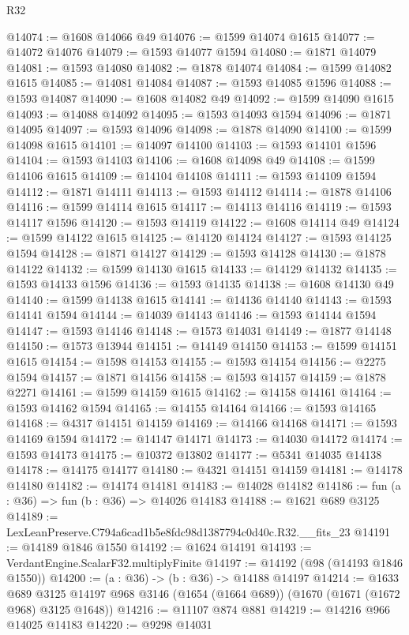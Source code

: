 \begin{lexlean}{R32}
\begin{coremodule}
@14074 := @1608 @14066 @49
@14076 := @1599 @14074 @1615
@14077 := @14072 @14076
@14079 := @1593 @14077 @1594
@14080 := @1871 @14079
@14081 := @1593 @14080
@14082 := @1878 @14074
@14084 := @1599 @14082 @1615
@14085 := @14081 @14084
@14087 := @1593 @14085 @1596
@14088 := @1593 @14087
@14090 := @1608 @14082 @49
@14092 := @1599 @14090 @1615
@14093 := @14088 @14092
@14095 := @1593 @14093 @1594
@14096 := @1871 @14095
@14097 := @1593 @14096
@14098 := @1878 @14090
@14100 := @1599 @14098 @1615
@14101 := @14097 @14100
@14103 := @1593 @14101 @1596
@14104 := @1593 @14103
@14106 := @1608 @14098 @49
@14108 := @1599 @14106 @1615
@14109 := @14104 @14108
@14111 := @1593 @14109 @1594
@14112 := @1871 @14111
@14113 := @1593 @14112
@14114 := @1878 @14106
@14116 := @1599 @14114 @1615
@14117 := @14113 @14116
@14119 := @1593 @14117 @1596
@14120 := @1593 @14119
@14122 := @1608 @14114 @49
@14124 := @1599 @14122 @1615
@14125 := @14120 @14124
@14127 := @1593 @14125 @1594
@14128 := @1871 @14127
@14129 := @1593 @14128
@14130 := @1878 @14122
@14132 := @1599 @14130 @1615
@14133 := @14129 @14132
@14135 := @1593 @14133 @1596
@14136 := @1593 @14135
@14138 := @1608 @14130 @49
@14140 := @1599 @14138 @1615
@14141 := @14136 @14140
@14143 := @1593 @14141 @1594
@14144 := @14039 @14143
@14146 := @1593 @14144 @1594
@14147 := @1593 @14146
@14148 := @1573 @14031
@14149 := @1877 @14148
@14150 := @1573 @13944
@14151 := @14149 @14150
@14153 := @1599 @14151 @1615
@14154 := @1598 @14153
@14155 := @1593 @14154
@14156 := @2275 @1594
@14157 := @1871 @14156
@14158 := @1593 @14157
@14159 := @1878 @2271
@14161 := @1599 @14159 @1615
@14162 := @14158 @14161
@14164 := @1593 @14162 @1594
@14165 := @14155 @14164
@14166 := @1593 @14165
@14168 := @4317 @14151 @14159
@14169 := @14166 @14168
@14171 := @1593 @14169 @1594
@14172 := @14147 @14171
@14173 := @14030 @14172
@14174 := @1593 @14173
@14175 := @10372 @13802
@14177 := @5341 @14035 @14138
@14178 := @14175 @14177
@14180 := @4321 @14151 @14159
@14181 := @14178 @14180
@14182 := @14174 @14181
@14183 := @14028 @14182
@14186 := fun (a : @36) => fun (b : @36) => @14026 @14183
@14188 := @1621 @689 @3125
@14189 := LexLeanPreserve.C794a6cad1b5e8fdc98d1387794c0d40c.R32.__fits_23
@14191 := @14189 @1846 @1550
@14192 := @1624 @14191
@14193 := VerdantEngine.ScalarF32.multiplyFinite
@14197 := @14192 (@98 (@14193 @1846 @1550))
@14200 := (a : @36) -> (b : @36) -> @14188 @14197
@14214 := @1633
    @689
    @3125
    @14197
    @968
    @3146
    (@1654 (@1664 @689))
    (@1670 (@1671 (@1672 @968) @3125 @1648))
@14216 := @11107 @874 @881
@14219 := @14216 @966 @14025 @14183
@14220 := @9298 @14031

\end{coremodule}
\end{lexlean}
